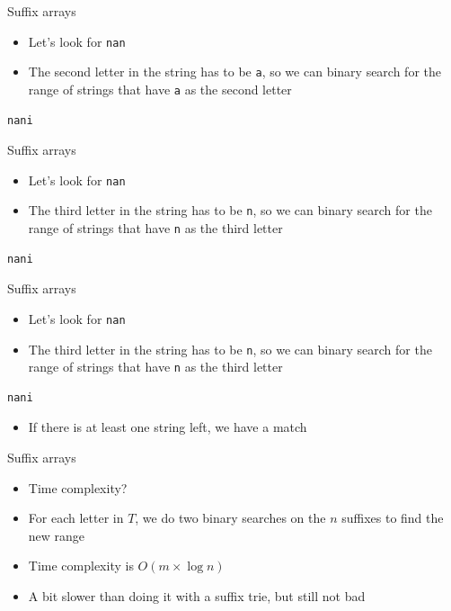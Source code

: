 \documentclass{beamer}
\begin{document}
\begin{frame}[fragile]{Suffix arrays}
    \begin{itemize}
\item Let's look for \texttt{nan}
\item The second letter in the string has to be \texttt{a}, so we can binary search for the range of strings that have \texttt{a} as the second letter
    \end{itemize}
    \vspace{10pt}
    \begin{verbatim}
nani
    \end{verbatim}
\end{frame}

\begin{frame}[fragile]{Suffix arrays}
    \begin{itemize}
\item Let's look for \texttt{nan}
\item The third letter in the string has to be \texttt{n}, so we can binary search for the range of strings that have \texttt{n} as the third letter
    \end{itemize}
    \vspace{10pt}
    \begin{verbatim}
nani
    \end{verbatim}
\end{frame}

\begin{frame}[fragile]{Suffix arrays}
    \begin{itemize}
\item Let's look for \texttt{nan}
\item The third letter in the string has to be \texttt{n}, so we can binary search for the range of strings that have \texttt{n} as the third letter
    \end{itemize}
    \vspace{10pt}
    \begin{verbatim}
nani
    \end{verbatim}
    \begin{itemize}
\item<2-> If there is at least one string left, we have a match
    \end{itemize}
\end{frame}

\begin{frame}{Suffix arrays}
    \begin{itemize}
        \item Time complexity?
            \vspace{5pt}
        \item For each letter in $T$, we do two binary searches on the $n$ suffixes to find the new range
        \item Time complexity is $O(m \times \log n)$
            \vspace{10pt}
        \item A bit slower than doing it with a suffix trie, but still not bad
    \end{itemize}
\end{frame}
\end{document}
